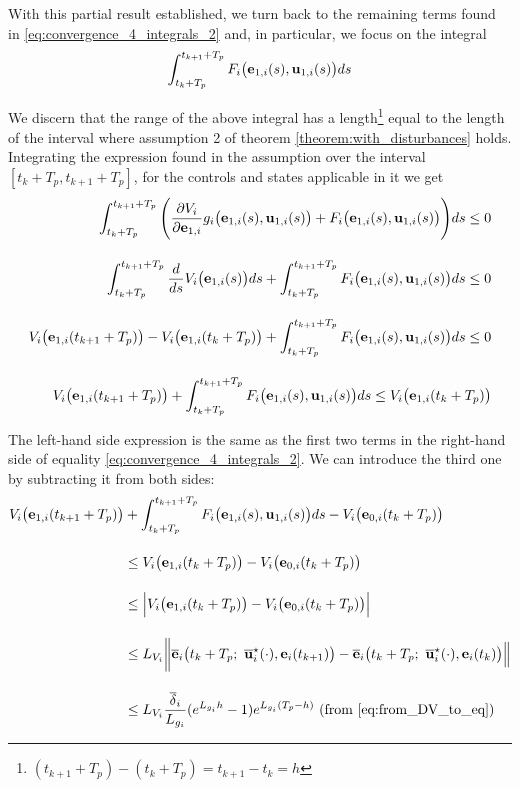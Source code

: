 With this partial result established, we turn back to the remaining terms
found in \eqref{eq:convergence_4_integrals_2} and, in particular, we focus on
the integral
\begin{align}
  \int_{t_k + T_p}^{t_{k+1} + T_p} F_i \big(\bm{\mathbf{e}}_{1,i}(s), \bm{\mathbf{u}}_{1,i} (s)\big) d s
\end{align}
\begin{gg_box}
  We discern that the range of the above integral has a length\footnote{$(t_{k+1} + T_p) - (t_k + T_p) = t_{k+1} - t_k = h$}
  equal to the length of the interval where assumption 2 of theorem
  \eqref{theorem:with_disturbances} holds.
  Integrating the expression found in the assumption over the
  interval $[t_k + T_p, t_{k+1} + T_p]$, for the controls and states applicable
  in it we get
  \begin{align}
    \int_{t_k + T_p}^{t_{k+1} + T_p} \Bigg(\dfrac{\partial V_i}{\partial \bm{\mathbf{e}}_{1,i}} g_i\big(\bm{\mathbf{e}}_{1,i}(s), \bm{\mathbf{u}}_{1,i}(s)\big)
    + F_i\big(\bm{\mathbf{e}}_{1,i}(s), \bm{\mathbf{u}}_{1,i}(s)\big)\Bigg) ds \leq 0 \\[2.5ex]
    \int_{t_k + T_p}^{t_{k+1} + T_p} \dfrac{d}{ds} V_i\big(\bm{\mathbf{e}}_{1,i}(s)\big) d s
    + \int_{t_k + T_p}^{t_{k+1} + T_p} F_i\big(\bm{\mathbf{e}}_{1,i}(s), \bm{\mathbf{u}}_{1,i}(s)\big) ds \leq 0 \\[2.5ex]
    V_i\big(\bm{\mathbf{e}}_{1,i}(t_{k+1} + T_p)\big) - V_i\big(\bm{\mathbf{e}}_{1,i}(t_k + T_p)\big)
    + \int_{t_k + T_p}^{t_{k+1} + T_p} F_i\big(\bm{\mathbf{e}}_{1,i}(s), \bm{\mathbf{u}}_{1,i}(s)\big) ds \leq 0 \\[2.5ex]
    V_i\big(\bm{\mathbf{e}}_{1,i}(t_{k+1} + T_p)\big)
    + \int_{t_k + T_p}^{t_{k+1} + T_p} F_i\big(\bm{\mathbf{e}}_{1,i}(s), \bm{\mathbf{u}}_{1,i}(s)\big) ds \leq V_i\big(\bm{\mathbf{e}}_{1,i}(t_k + T_p)\big)
  \end{align}

  The left-hand side expression is the same as the first two terms in the
  right-hand side of equality \eqref{eq:convergence_4_integrals_2}. We can
  introduce the third one by subtracting it from both sides:
  \begin{align}
    V_i\big(\vect{e}_{1,i}(t_{k+1} + T_p)\big)
    &+ \int_{t_k + T_p}^{t_{k+1} + T_p} F_i\big(\vect{e}_{1,i}(s), \vect{u}_{1,i}(s)\big) ds
    - V_i\big(\vect{e}_{0,i}(t_k + T_p)\big) \\[2.5ex]
    &\leq V_i\big(\vect{e}_{1,i}(t_k + T_p)\big)
    - V_i\big(\vect{e}_{0,i}(t_k + T_p)\big) \\[2.5ex]
    &\leq \Big|V_i\big(\vect{e}_{1,i}(t_k + T_p)\big)
    - V_i\big(\vect{e}_{0,i}(t_k + T_p)\big)\Big| \\[2.5ex]
    &\leq L_{V_i}\bigg \|\overline{\vect{e}}_i\big(t_k + T_p;\ \overline{\vect{u}}_i^{\star}(\cdot), \vect{e}_i(t_{k+1})\big)
    - \overline{\vect{e}}_i\big(t_k + T_p;\ \overline{\vect{u}}_i^{\star}(\cdot), \vect{e}_i(t_k) \big)\Big\| \\[2.5ex]
    &\leq L_{V_i} \dfrac{\overline{\delta}_i}{L_{g_i}} (e^{L_{g_i}h} - 1) e^{L_{g_i} (T_p - h)} \text{ (from \eqref{eq:from_DV_to_eq})}
  \end{align}
\end{gg_box}
